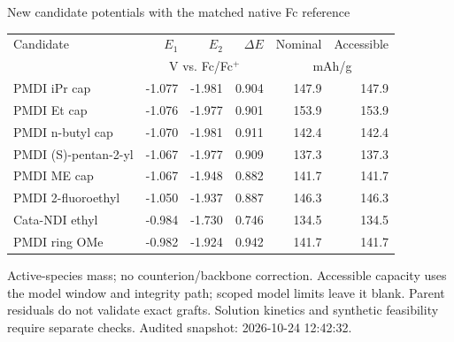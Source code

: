 \begin{frame}{New candidate potentials with the matched native Fc reference}
\scriptsize\renewcommand{\arraystretch}{1.25}\centering
\begin{tabular}{@{}p{4.7cm}rrrrr@{}}\toprule
Candidate & $E_1$ & $E_2$ & $\Delta E$ & Nominal & Accessible \\
& \multicolumn{3}{c}{V vs. Fc/Fc$^+$} & \multicolumn{2}{c}{mAh/g} \\ \midrule
PMDI iPr cap & -1.077 & -1.981 & 0.904 & 147.9 & 147.9 \\
PMDI Et cap & -1.076 & -1.977 & 0.901 & 153.9 & 153.9 \\
PMDI n-butyl cap & -1.070 & -1.981 & 0.911 & 142.4 & 142.4 \\
PMDI (S)-pentan-2-yl & -1.067 & -1.977 & 0.909 & 137.3 & 137.3 \\
PMDI ME cap & -1.067 & -1.948 & 0.882 & 141.7 & 141.7 \\
PMDI 2-fluoroethyl & -1.050 & -1.937 & 0.887 & 146.3 & 146.3 \\
Cata-NDI ethyl & -0.984 & -1.730 & 0.746 & 134.5 & 134.5 \\
PMDI ring OMe & -0.982 & -1.924 & 0.942 & 141.7 & 141.7 \\
\bottomrule\end{tabular}\par
\vspace{1ex}\raggedright
\footnotesize Active-species mass; no counterion/backbone correction. Accessible capacity uses the model window and integrity path; scoped model limits leave it blank.
\vspace{1ex}\scriptsize Parent residuals do not validate exact grafts. Solution kinetics and synthetic feasibility require separate checks.
\vfill\scriptsize Audited snapshot: 2026-10-24 12:42:32.
\end{frame}
